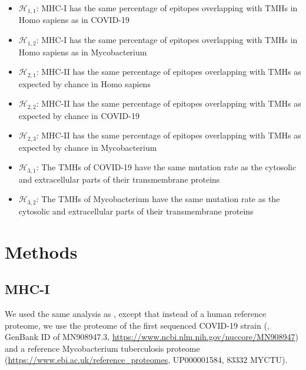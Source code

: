 \documentclass{article}
\begin{document}
\begin{itemize}
  \item $\mathcal{H}_{1,1}$: MHC-I has the same percentage of epitopes overlapping
    with TMHs in Homo sapiens as in COVID-19
  \item $\mathcal{H}_{1,2}$: MHC-I has the same percentage of epitopes overlapping
    with TMHs in Homo sapiens as in Mycobacterium
  \item $\mathcal{H}_{2,1}$: MHC-II has the same percentage of epitopes overlapping
    with TMHs as expected by chance in Homo sapiens
  \item $\mathcal{H}_{2,2}$: MHC-II has the same percentage of epitopes overlapping
    with TMHs as expected by chance in COVID-19
  \item $\mathcal{H}_{2,3}$: MHC-II has the same percentage of epitopes overlapping
    with TMHs as expected by chance in Mycobacterium
  \item $\mathcal{H}_{3,1}$: The TMHs of COVID-19
    have the same mutation rate 
    as the cytosolic and extracellular parts of their transmembrane proteins
  \item $\mathcal{H}_{3,2}$: The TMHs of Mycobacterium
    have the same mutation rate 
    as the cytosolic and extracellular parts of their transmembrane proteins
\end{itemize}

\section{Methods}

\subsection{MHC-I}

We used the same analysis as \cite{bianchi2017},
except that instead of a human reference proteome,
we use the proteome of the first sequenced COVID-19 strain (\cite{wu2020new},
GenBank ID of MN908947.3, \url{https://www.ncbi.nlm.nih.gov/nuccore/MN908947})
and a reference Mycobacterium tuberculosis 
proteome (\url{https://www.ebi.ac.uk/reference_proteomes}, UP000001584, 
83332 MYCTU).
\end{document}

